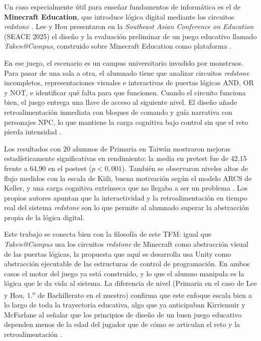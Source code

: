 \documentclass[a4paper,12pt]{article}
\begin{document}
Un caso especialmente útil para enseñar fundamentos de informática es el de \textbf{Minecraft Education}, que introduce lógica digital mediante los circuitos \textit{redstone} \citep{minecraftLogicGates}. Lee y Hou presentaron en la \textit{Southeast Asian Conference on Education} (SEACE 2025) el diseño y la evaluación preliminar de un juego educativo llamado \textit{Taken@Campus}, construido sobre Minecraft Education como plataforma \citep{lee2025minecraft}.

En ese juego, el escenario es un campus universitario invadido por monstruos. Para pasar de una sala a otra, el alumnado tiene que analizar circuitos \textit{redstone} incompletos, representaciones visuales e interactivas de puertas lógicas AND, OR y NOT, e identificar qué falta para que funcionen. Cuando el circuito funciona bien, el juego entrega una llave de acceso al siguiente nivel. El diseño añade retroalimentación inmediata con bloques de comando y guía narrativa con personajes NPC, lo que mantiene la carga cognitiva bajo control sin que el reto pierda intensidad \citep{lee2025minecraft}.

Los resultados con 20 alumnos de Primaria en Taiwán mostraron mejoras estadísticamente significativas en rendimiento: la media en pretest fue de 42{,}15 frente a 64{,}90 en el postest ($p < 0{,}001$). También se observaron niveles altos de flujo medidos con la escala de Kiili, buena motivación según el modelo ARCS de Keller, y una carga cognitiva extrínseca que no llegaba a ser un problema \citep{lee2025minecraft, kiili2006flow, keller1987arcs}. Los propios autores apuntan que la interactividad y la retroalimentación en tiempo real del sistema \textit{redstone} son lo que permite al alumnado superar la abstracción propia de la lógica digital.

Este trabajo se conecta bien con la filosofía de este TFM: igual que \textit{Taken@Campus} usa los circuitos \textit{redstone} de Minecraft como abstracción visual de las puertas lógicas, la propuesta que aquí se desarrolla usa Unity como abstracción ejecutable de las estructuras de control de programación. En ambos casos el motor del juego ya está construido, y lo que el alumno manipula es la lógica que le da vida al sistema. La diferencia de nivel (Primaria en el caso de Lee y Hou, 1.\textsuperscript{o} de Bachillerato en el nuestro) confirma que este enfoque escala bien a lo largo de toda la trayectoria educativa, algo que ya anticipaban Kirriemuir y McFarlane al señalar que los principios de diseño de un buen juego educativo dependen menos de la edad del jugador que de cómo se articulan el reto y la retroalimentación \citep{kirriemuir2004literature}.
\end{document}
